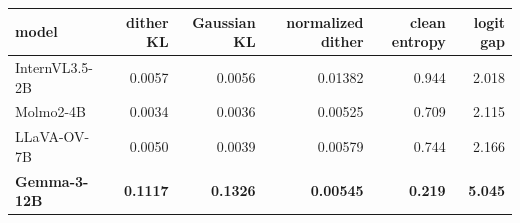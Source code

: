 \small
\setlength{\tabcolsep}{6pt}
\begin{tabular}{@{}lrrrrr@{}}
\toprule
model & dither KL & Gaussian KL & normalized dither & clean entropy & logit gap \\
\midrule
InternVL3.5-2B & 0.0057 & 0.0056 & 0.01382 & 0.944 & 2.018 \\
Molmo2-4B & 0.0034 & 0.0036 & 0.00525 & 0.709 & 2.115 \\
LLaVA-OV-7B & 0.0050 & 0.0039 & 0.00579 & 0.744 & 2.166 \\
\textbf{Gemma-3-12B} & \textbf{0.1117} & \textbf{0.1326} & \textbf{0.00545} & \textbf{0.219} & \textbf{5.045} \\
\bottomrule
\end{tabular}

\vspace{3pt}
